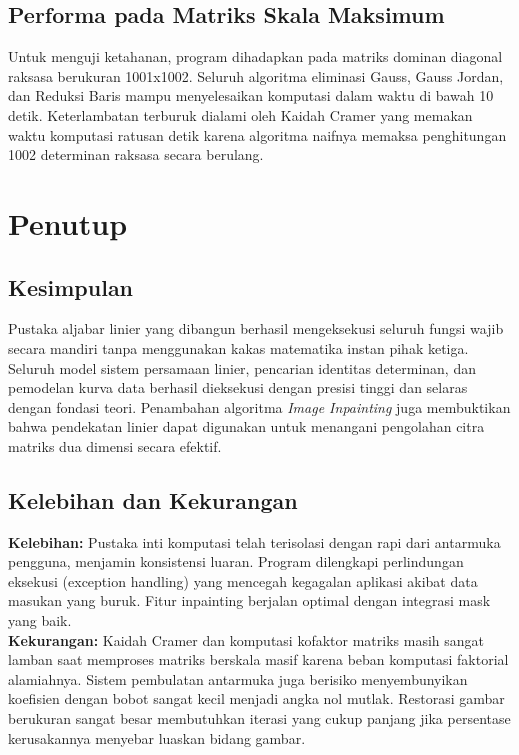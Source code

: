 \documentclass[12pt, a4paper]{article}
\begin{document}
\subsection{Performa pada Matriks Skala Maksimum}
Untuk menguji ketahanan, program dihadapkan pada matriks dominan diagonal raksasa berukuran 1001x1002. Seluruh algoritma eliminasi Gauss, Gauss Jordan, dan Reduksi Baris mampu menyelesaikan komputasi dalam waktu di bawah 10 detik. Keterlambatan terburuk dialami oleh Kaidah Cramer yang memakan waktu komputasi ratusan detik karena algoritma naifnya memaksa penghitungan 1002 determinan raksasa secara berulang.


\section{Penutup}

\subsection{Kesimpulan}
Pustaka aljabar linier yang dibangun berhasil mengeksekusi seluruh fungsi wajib secara mandiri tanpa menggunakan kakas matematika instan pihak ketiga. Seluruh model sistem persamaan linier, pencarian identitas determinan, dan pemodelan kurva data berhasil dieksekusi dengan presisi tinggi dan selaras dengan fondasi teori. Penambahan algoritma \textit{Image Inpainting} juga membuktikan bahwa pendekatan linier dapat digunakan untuk menangani pengolahan citra matriks dua dimensi secara efektif.

\subsection{Kelebihan dan Kekurangan}
\textbf{Kelebihan:} Pustaka inti komputasi telah terisolasi dengan rapi dari antarmuka pengguna, menjamin konsistensi luaran. Program dilengkapi perlindungan eksekusi (exception handling) yang mencegah kegagalan aplikasi akibat data masukan yang buruk. Fitur inpainting berjalan optimal dengan integrasi mask yang baik. \\
\textbf{Kekurangan:} Kaidah Cramer dan komputasi kofaktor matriks masih sangat lamban saat memproses matriks berskala masif karena beban komputasi faktorial alamiahnya. Sistem pembulatan antarmuka juga berisiko menyembunyikan koefisien dengan bobot sangat kecil menjadi angka nol mutlak. Restorasi gambar berukuran sangat besar membutuhkan iterasi yang cukup panjang jika persentase kerusakannya menyebar luaskan bidang gambar.
\end{document}
